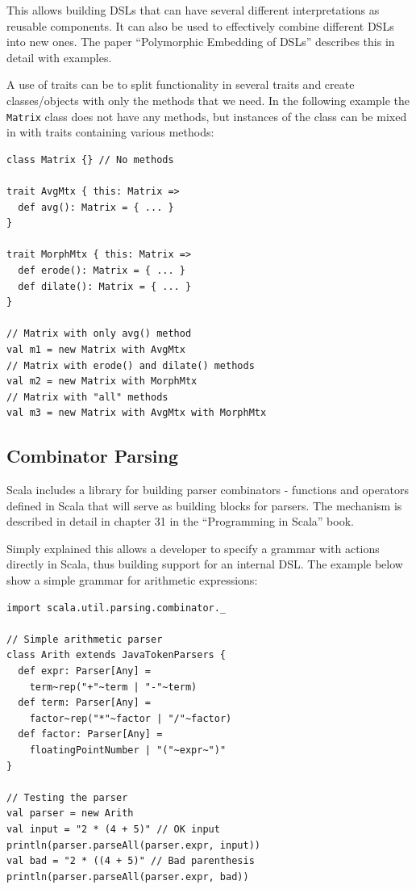 \documentclass[a4paper,english]{report}
\begin{document}
This allows building DSLs that can have several different
interpretations as reusable components. It can also be used to
effectively combine different DSLs into new ones. The paper
``Polymorphic Embedding of DSLs''\cite{hof08} describes this in detail
with examples.

A use of traits can be to split functionality in several traits and
create classes/objects with only the methods that we need. In the
following example the \texttt{Matrix} class does not have any methods,
but instances of the class can be mixed in with traits containing
various methods:

\begin{lstlisting}
class Matrix {} // No methods

trait AvgMtx { this: Matrix =>
  def avg(): Matrix = { ... }
}

trait MorphMtx { this: Matrix =>
  def erode(): Matrix = { ... }
  def dilate(): Matrix = { ... }
}

// Matrix with only avg() method
val m1 = new Matrix with AvgMtx
// Matrix with erode() and dilate() methods
val m2 = new Matrix with MorphMtx
// Matrix with "all" methods
val m3 = new Matrix with AvgMtx with MorphMtx
\end{lstlisting}

\subsection{Combinator Parsing}
\label{sec:combparse}

Scala includes a library for building parser combinators - functions
and operators defined in Scala that will serve as building blocks for
parsers. The mechanism is described in detail in chapter 31 in the
``Programming in Scala'' book\cite{ode08}.

Simply explained this allows a developer to specify a grammar with
actions directly in Scala, thus building support for an internal
DSL. The example below show a simple grammar for arithmetic
expressions:

\begin{lstlisting}
import scala.util.parsing.combinator._ 

// Simple arithmetic parser
class Arith extends JavaTokenParsers { 
  def expr: Parser[Any] =
    term~rep("+"~term | "-"~term) 
  def term: Parser[Any] =
    factor~rep("*"~factor | "/"~factor) 
  def factor: Parser[Any] =
    floatingPointNumber | "("~expr~")" 
}

// Testing the parser
val parser = new Arith
val input = "2 * (4 + 5)" // OK input
println(parser.parseAll(parser.expr, input))
val bad = "2 * ((4 + 5)" // Bad parenthesis
println(parser.parseAll(parser.expr, bad))
\end{lstlisting}
\end{document}
